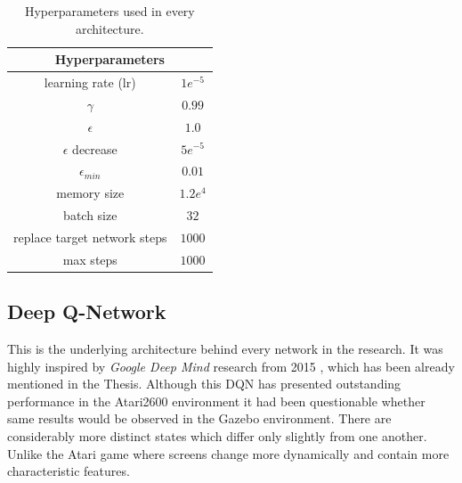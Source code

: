 \begin{table}[h]
    \centering
    \begin{tabular}{|c c|}
        \hline
        \multicolumn{2}{|c|}{Hyperparameters} \\
        \hline
        learning rate (lr) & $1e^{-5}$ \\
        $\gamma$ & $0.99$ \\
        $\epsilon$ & $1.0$ \\
        $\epsilon$ decrease & $5e^{-5}$ \\
        $\epsilon_{min}$ & $0.01$ \\
        memory size & $1.2e^4$ \\
        batch size & $32$ \\
        replace target network steps & $1000$ \\
        max steps & $1000$ \\
        \hline
    \end{tabular}
    \caption{Hyperparameters used in every architecture.}
    \label{tab:hyperparameters}
\end{table}

\subsection{Deep Q-Network}
\label{sub:deep-q-network}

This is the underlying architecture behind every network in the research. It was highly inspired by \emph{Google Deep Mind} research from 2015 \cite{DQNAtari}, which has been already mentioned in the Thesis. Although this DQN has presented outstanding performance in the Atari2600 environment it had been questionable whether same results would be observed in the Gazebo environment. There are considerably more distinct states which differ only slightly from one another. Unlike the Atari game where screens change more dynamically and contain more characteristic features.

